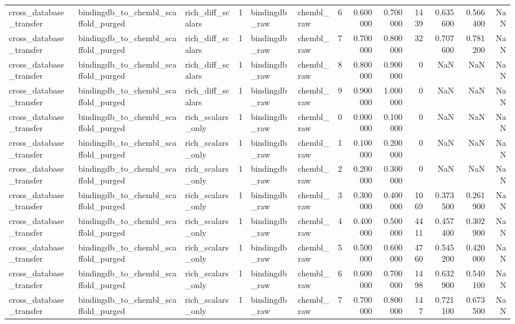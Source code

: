 \begin{longtable}{lllrllrrrrrrr}
cross\_database\_transfer & bindingdb\_to\_chembl\_scaffold\_purged & rich\_diff\_scalars & 1 & bindingdb\_raw & chembl\_raw & 6 & 0.600000 & 0.700000 & 1439 & 0.635600 & 0.566400 & NaN \\
cross\_database\_transfer & bindingdb\_to\_chembl\_scaffold\_purged & rich\_diff\_scalars & 1 & bindingdb\_raw & chembl\_raw & 7 & 0.700000 & 0.800000 & 32 & 0.707600 & 0.781200 & NaN \\
cross\_database\_transfer & bindingdb\_to\_chembl\_scaffold\_purged & rich\_diff\_scalars & 1 & bindingdb\_raw & chembl\_raw & 8 & 0.800000 & 0.900000 & 0 & NaN & NaN & NaN \\
cross\_database\_transfer & bindingdb\_to\_chembl\_scaffold\_purged & rich\_diff\_scalars & 1 & bindingdb\_raw & chembl\_raw & 9 & 0.900000 & 1.000000 & 0 & NaN & NaN & NaN \\
cross\_database\_transfer & bindingdb\_to\_chembl\_scaffold\_purged & rich\_scalars\_only & 1 & bindingdb\_raw & chembl\_raw & 0 & 0.000000 & 0.100000 & 0 & NaN & NaN & NaN \\
cross\_database\_transfer & bindingdb\_to\_chembl\_scaffold\_purged & rich\_scalars\_only & 1 & bindingdb\_raw & chembl\_raw & 1 & 0.100000 & 0.200000 & 0 & NaN & NaN & NaN \\
cross\_database\_transfer & bindingdb\_to\_chembl\_scaffold\_purged & rich\_scalars\_only & 1 & bindingdb\_raw & chembl\_raw & 2 & 0.200000 & 0.300000 & 0 & NaN & NaN & NaN \\
cross\_database\_transfer & bindingdb\_to\_chembl\_scaffold\_purged & rich\_scalars\_only & 1 & bindingdb\_raw & chembl\_raw & 3 & 0.300000 & 0.400000 & 1069 & 0.373500 & 0.261900 & NaN \\
cross\_database\_transfer & bindingdb\_to\_chembl\_scaffold\_purged & rich\_scalars\_only & 1 & bindingdb\_raw & chembl\_raw & 4 & 0.400000 & 0.500000 & 4411 & 0.457400 & 0.302900 & NaN \\
cross\_database\_transfer & bindingdb\_to\_chembl\_scaffold\_purged & rich\_scalars\_only & 1 & bindingdb\_raw & chembl\_raw & 5 & 0.500000 & 0.600000 & 4760 & 0.545200 & 0.420000 & NaN \\
cross\_database\_transfer & bindingdb\_to\_chembl\_scaffold\_purged & rich\_scalars\_only & 1 & bindingdb\_raw & chembl\_raw & 6 & 0.600000 & 0.700000 & 1498 & 0.632900 & 0.540100 & NaN \\
cross\_database\_transfer & bindingdb\_to\_chembl\_scaffold\_purged & rich\_scalars\_only & 1 & bindingdb\_raw & chembl\_raw & 7 & 0.700000 & 0.800000 & 147 & 0.721100 & 0.673500 & NaN \\

\end{longtable}
